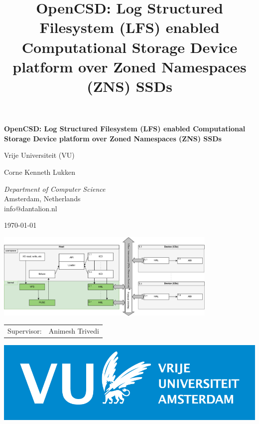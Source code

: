 \documentclass[conference]{IEEEtran}
\title{OpenCSD: Log Structured Filesystem (LFS) enabled Computational Storage Device platform over Zoned Namespaces (ZNS) SSDs%
}
\begin{document}
\begin{titlepage}
\begingroup
\centering
{\LARGE\bfseries OpenCSD: Log Structured Filesystem (LFS) enabled Computational Storage Device platform over Zoned Namespaces (ZNS) SSDs}

\vspace{1cm}

{\Large Vrije Universiteit (VU)}

\vspace{0.5cm}

{Corne Kenneth Lukken}

{\textit{Department of Computer Science} \\
Amsterdam, Netherlands \\
info@dantalion.nl}

\vspace{0.5cm}

\today

\vspace{4.0cm}

\includegraphics[width=0.8\textwidth]{resources/images/loader-pfs-arch-2.drawio.png}

\vfill
\endgroup
\begin{minipage}{0.4\textwidth}
	\begin{tabular}{ll}
		\Large Supervisor: & \Large Animesh Trivedi \\
	\end{tabular}
\end{minipage} \hfill
\begin{minipage}{0.3\textwidth}
	\begin{flushright}
	\includegraphics[width=\textwidth]{resources/images/vu-logo.png}
\end{flushright}
\end{minipage}
\end{titlepage}
\end{document}
